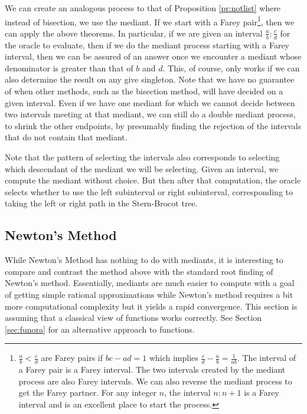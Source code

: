\documentclass[12pt]{article}
\theoremstyle{remark}
\begin{document}
We can create an analogous process to that of Proposition \ref{pr:notlist} where instead of bisection, we use the mediant. If we start with a Farey pair\footnote{$\frac{a}{b} < \frac{c}{d}$ are Farey pairs if $bc-ad=1$ which implies $\frac{c}{d} - \frac{a}{b} = \frac{1}{ab}$. The interval of a Farey pair is a Farey interval. The two intervals created by the mediant process are also Farey intervals. We can also reverse the mediant process to get the Farey partner. For any integer $n$, the interval $n:n+1$ is a Farey interval and is an excellent place to start the process.}, then we can apply the above theorems. In particular, if we are given an interval $\frac{a}{b} : \frac{c}{d}$ for the oracle to evaluate, then if we do the mediant process starting with a Farey interval, then we can be assured of an answer once we encounter a mediant whose denominator is greater than that of $b$ and $d$. This, of course, only works if we can also determine the result on any give singleton. Note that we have no guarantee of when other methods, such as the bisection method, will have decided on a given interval. Even if we have one mediant for which we cannot decide between two intervals meeting at that mediant, we can still do a double mediant process, to shrink the other endpoints, by presumably finding the rejection of the intervals that do not contain that mediant. 

Note that the pattern of selecting the intervals also corresponds to selecting which descendant of the mediant we will be selecting. Given an interval, we compute the mediant without choice. But then after that computation, the oracle selects whether to use the left subinterval or right subinterval, corresponding to taking the left or right path in the Stern-Brocot tree.


\subsection{Newton's Method}

While Newton's Method has nothing to do with mediants, it is interesting to compare and contrast the method above with the standard root finding of Newton's method. Essentially, mediants are much easier to compute with a goal of getting simple rational approximations while Newton's method requires a bit more computational complexity but it yields a rapid convergence. This section is assuming that a classical view of functions works correctly. See Section \ref{sec:funora} for an alternative approach to functions.
\end{document}
